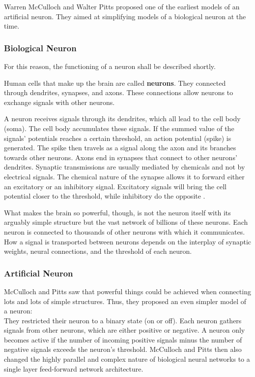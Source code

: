 Warren McCulloch and Walter Pitts proposed one of the earliest models of an artificial neuron.
They aimed at simplifying models of a biological neuron at the time.

\subsubsection{Biological Neuron}
For this reason, the functioning of a neuron shall be described shortly.

Human cells that make up the brain are called \textbf{neurons}.
They connected through dendrites, synapses, and axons.
These connections allow neurons to exchange signals with other neurons.

A neuron receives signals through its dendrites, which all lead to the cell body (soma).
The cell body accumulates these signals.
If the summed value of the signals' potentials reaches a certain threshold, an action potential (spike) is generated.
The spike then travels as a signal along the axon and its branches towards other neurons.
Axons end in synapses that connect to other neurons' dendrites.
Synaptic transmissions are usually mediated by chemicals and not by electrical signals.
The chemical nature of the synapse allows it to forward either an excitatory or an inhibitory signal.
Excitatory signals will bring the cell potential closer to the threshold, while inhibitory do the opposite \cite[p.~42]{coloratlas}.

What makes the brain so powerful, though, is not the neuron itself with its arguably simple structure but the vast network of billions of these neurons.
Each neuron is connected to thousands of other neurons with which it communicates.
How a signal is transported between neurons depends on the interplay of synaptic weights, neural connections, and the threshold of each neuron.

\subsubsection{Artificial Neuron}
McCulloch and Pitts saw that powerful things could be achieved when connecting lots and lots of simple structures.
Thus, they proposed an even simpler model of a neuron: \\
They restricted their neuron to a binary state (on or off).
Each neuron gathers signals from other neurons, which are either positive or negative.
A neuron only becomes active if the number of incoming positive signals minus the number of negative signals exceeds the neuron's threshold.
McCulloch and Pitts then also changed the highly parallel and complex nature of biological neural networks to a single layer feed-forward network architecture.

